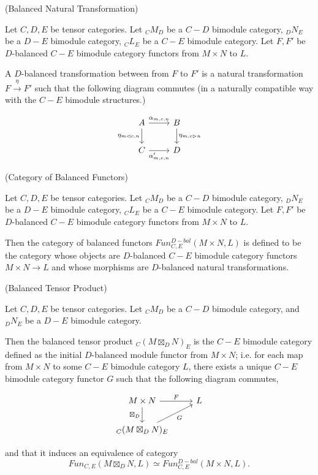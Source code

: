 \begin{definition} (Balanced Natural Transformation)

  \noindent Let $C, D, E$ be tensor categories. Let $_{C}M_{D}$ be a $C-D$
  bimodule category, $_{D}N_{E}$ be a $D-E$ bimodule category, $_{C}L_{E}$ be
  a $C-E$ bimodule category. Let $F, F'$ be $D$-balanced $C-E$ bimodule
  category functors from $M \times N$ to $L$.

  \noindent A $D$-balanced transformation between from $F$ to $F'$ is a
  natural transformation $ F \xrightarrow{\eta} F'$ such that the following
  diagram commutes (in a naturally compatible way with the $C-E$ bimodule
  structures.)

  \[
    \begin{tikzcd}
      A \arrow[r, "\alpha_{m,c,n}"] \arrow[d, "\eta_{m \lhd c, n}"'] &
      B \arrow[d, "\eta_{m, c \rhd n}"] \\
      C \arrow[r, "\alpha_{m,c,n}'"'] & D
    \end{tikzcd}
  \]
\end{definition}

\begin{definition} (Category of Balanced Functors)

  \noindent Let $C, D, E$ be tensor categories. Let $_{C}M_{D}$ be a $C-D$
  bimodule category, $_{D}N_{E}$ be a $D-E$ bimodule category, $_{C}L_{E}$ be
  a $C-E$ bimodule category. Let $F, F'$ be $D$-balanced $C-E$ bimodule
  category functors from $M \times N$ to $L$.

  \noindent Then the category of balanced functors
  $Fun^{D-bal}_{C,E}(M \times N, L)$ is defined to be the category whose
  objects are $D$-balanced $C-E$ bimodule category functors $M \times N \to L$
  and whose morphisms are $D$-balanced natural transformations.
\end{definition}

\begin{definition} (Balanced Tensor Product)

  \noindent Let $C, D, E$ be tensor categories. Let $_{C}M_{D}$ be a $C-D$
  bimodule category, and $_{D}N_{E}$ be a $D-E$ bimodule category.

  \noindent Then the balanced tensor product $_{C}(M \boxtimes_{D} N)_{E}$ is
  the $C-E$ bimodule category defined as the initial $D$-balanced module
  functor from $M \times N$; i.e. for each map from $M \times N$ to some $C-E$
  bimodule category $L$, there exists a unique $C-E$ bimodule category functor
  $G$ such that the following diagram commutes,

  \[
    \begin{tikzcd}
      M \times N \arrow[r, "F"] \arrow[d, "\boxtimes_{D}"'] & L \\
      _{C}(M \boxtimes_{D} N)_{E} \arrow[ur, "G"']
    \end{tikzcd}
  \]

  \noindent and that it induces an equivalence of category
  \[Fun_{C,E}(M \boxtimes_{D} N, L) \simeq Fun_{C,E}^{D-bal}(M \times N, L).\]
\end{definition}

